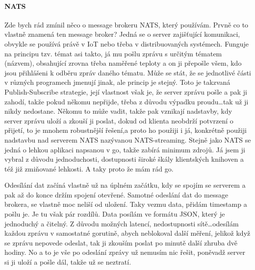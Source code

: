 \paragraph*{NATS}
Zde bych rád zmínil něco o message brokeru NATS, který používám. Prvně co to vlastně znamená ten message broker? Jedná 
se o server zajišťující komunikaci, obvykle se používá právě v IoT nebo třeba v distribuovaných systémech. Funguje na 
principu tzv. témat asi takto, já mu pošlu zprávu s určitým tématem (názvem), obsahující zrovna třeba naměřené teploty 
a on ji přepošle všem, kdo jsou přihlášeni k odběru zpráv daného tématu. Může se stát, že se jednotlivé části v různých 
programech jmenují jinak, ale princip je stejný. Toto je takzvaná Publish-Subscribe strategie, její vlastnost však je, 
že server zprávu pošle a pak ji zahodí, takže pokud někomu nepřijde, třeba z důvodu výpadku proudu\ldots tak už ji nikdy 
nedostane. Někomu to může vadit, takže pak vznikají nadstavby, kdy server zprávu uloží a zkouší ji poslat, dokud od 
klienta neobdrží potvrzení o přijetí, to je mnohem robustnější řešení,a proto ho použiji i já, konkrétně použiji 
nadstavbu nad serverem NATS nazývanou NATS-streaming. Stejně jako NATS se jedná o lehkou aplikaci napsanou v go, takže 
zabírá minimum zdrojů. Já jsem ji vybral z důvodu jednoduchosti, dostupnosti široké škály klientských knihoven a též již 
zmiňované lehkosti. A taky proto že mám rád go.

Odesílání dat začíná vlastně už na úplném začátku, kdy se spojím se serverem a pak až do konce držím spojení otevřené. 
Samotné odeslání dat do message brokera, se vlastně moc neliší od uložení. Taky vezmu data, přidám timestamp a pošlu je. 
Je tu však pár rozdílů. Data posílám ve formátu JSON, který je jednoduchý a čitelný. Z důvodu možných latencí, 
nedostupnosti sítě\ldots odesílám každou zprávu v samostatné gorutině, abych neblokoval další měření, jelikož když se 
zprávu nepovede odeslat, tak ji zkouším poslat po minutě další zhruba dvě hodiny. No a to je vše po odeslání zprávy už 
nemusím nic řešit, poněvadž server si ji uloží a pošle dál, takže už se neztratí.
